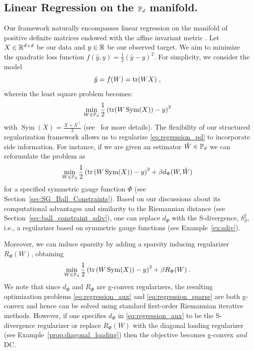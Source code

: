 \documentclass[sn-nature]{sn-jnl}%
\theoremstyle{thmstyleone}%
\theoremstyle{thmstyletwo}%
\theoremstyle{thmstylethree}%
\begin{document}
\subsection{Linear Regression on the $\mathbb{P}_d$ manifold.}\label{section:linear_regression}
Our framework naturally encompasses linear regression on the manifold of positive definite matrices endowed with the affine invariant metric \cite{regression_pd}. 
Let $X \in \mathbb{R}^{d \times d}$ be our data and $y \in \mathbb{R}$ be our observed target. We aim to minimize the quadratic loss function $f(\hat{y}, y) = \frac{1}{2}\left(\hat{y}-y\right)^2$. For simplicity, we consider the model 
\begin{equation}
\hat{y} = f(W) = \text{tr}(WX) \; , 
\end{equation}
wherein the least square problem becomes: 
\begin{equation}\label{eq:regression_pd}
\min_{W \in \mathbb{P}_d} \frac{1}{2}\left(\text{tr}(W \operatorname{Sym}(X)) - y\right)^2   
\end{equation}
with $\operatorname{Sym}(X) = \frac{X + X^\top}{2}$ (see~\cite[sec. 5]{regression_pd} for more details). The flexibility of our structured regularization framework allows us to regularize \eqref{eq:regression_pd} to incorporate side information. For instance, if we are given an estimator $\hat{W} \in \mathbb{P}_d$ we can reformulate the problem as
%
\begin{equation}\label{eq:regression_aux}
    \min_{W \in \mathbb{P}_d} \frac{1}{2}\left(\text{tr}\left(W \operatorname{Sym}(X)\right) - y\right)^2 + \beta d_{\Phi}(W, \hat{W}) 
\end{equation}
for a specified symmetric gauge function $\Phi$ (see Section~\ref{sec:SG_Ball_Constraints}). Based on our discussions about its computational advantages and similarity to the Riemannian distance (see Section~\ref{sec:ball_constraint_sdiv}), one can replace $d_\Phi$ with the S-divergence, $\delta_S^2$, i.e., a regularizer based on symmetric gauge functions (see Example~\ref{ex:sdiv}).

Moreover, we can induce sparsity by adding a sparsity inducing regularizer $R_\Phi(W)$, obtaining
\begin{equation}\label{eq:regression_sparse}
    \min_{W \in \mathbb{P}_d} \frac{1}{2}\left(\text{tr}\left(W \operatorname{Sym}(X)\right) - y\right)^2 + \beta R_{\Phi}(W) \; .
\end{equation}
We note that since $d_\Phi$ and $R_\Phi$ are g-convex regularizers, the resulting optimization problems  \eqref{eq:regression_aux}  and \eqref{eq:regression_sparse} are both g-convex and hence can be solved using standard first-order Riemannian iterative methods. However, if one specifies $d_\Phi$ in \eqref{eq:regression_aux} to be the S-divergence regularizer
or replace $R_\Phi(W)$ with the diagonal loading regularizer (see Example~\ref{prop:diagonal_loading}) then the objective becomes g-convex \textit{and} DC.
\end{document}
